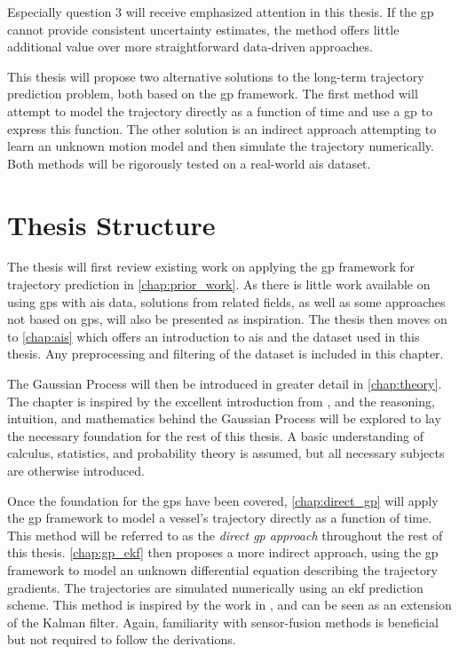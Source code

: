 Especially question 3 will receive emphasized attention in this thesis. If the \acrshort{gp} cannot provide consistent uncertainty estimates, the method offers little additional value over more straightforward data-driven approaches. 


This thesis will propose two alternative solutions to the long-term trajectory prediction problem, both based on the \acrshort{gp} framework. The first method will attempt to model the trajectory directly as a function of time and use a \acrshort{gp} to express this function. The other solution is an indirect approach attempting to learn an unknown motion model and then simulate the trajectory numerically. Both methods will be rigorously tested on a real-world \acrshort{ais} dataset.

\section{Thesis Structure}
The thesis will first review existing work on applying the \acrshort{gp} framework for trajectory prediction in \cref{chap:prior_work}. As there is little work available on using \acrshort{gp}s with \acrshort{ais} data, solutions from related fields, as well as some approaches not based on \acrshort{gp}s, will also be presented as inspiration. The thesis then moves on to \cref{chap:ais} which offers an introduction to \acrshort{ais} and the dataset used in this thesis. Any preprocessing and filtering of the dataset is included in this chapter.

The Gaussian Process will then be introduced in greater detail in \cref{chap:theory}. The chapter is inspired by the excellent introduction from \cite{rasmussen}, and the reasoning, intuition, and mathematics behind the Gaussian Process will be explored to lay the necessary foundation for the rest of this thesis. A basic understanding of calculus, statistics, and probability theory is assumed, but all necessary subjects are otherwise introduced.  

Once the foundation for the \acrshort{gp}s have been covered, \cref{chap:direct_gp} will apply the \acrshort{gp} framework to model a vessel's trajectory directly as a function of time. This method will be referred to as the \textit{direct \acrshort{gp} approach} throughout the rest of this thesis.
\cref{chap:gp_ekf} then proposes a more indirect approach, using the \acrshort{gp} framework to model an unknown differential equation describing the trajectory gradients. The trajectories are simulated numerically using an \acrshort{ekf} prediction scheme. This method is inspired by the work in \cite{pedestrian,gpekf}, and can be seen as an extension of the Kalman filter. Again, familiarity with sensor-fusion methods is beneficial but not required to follow the derivations.

